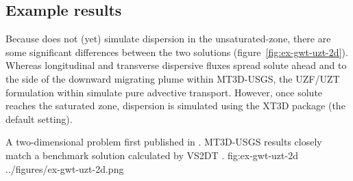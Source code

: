 \subsection{Example results}

Because \mf does not (yet) simulate dispersion in the unsaturated-zone, there are some significant differences between the two solutions (figure~\ref{fig:ex-gwt-uzt-2d}).  Whereas longitudinal and transverse dispersive fluxes spread solute ahead and to the side of the downward migrating plume within MT3D-USGS, the UZF/UZT formulation within \mf simulate pure advective transport.  However, once solute reaches the saturated zone, dispersion is simulated using the XT3D package (the default setting).  

\begin{StandardFigure}
	{A two-dimensional problem first published in \cite{morway2013}.  MT3D-USGS results closely match a benchmark solution calculated by VS2DT \citep{lappalaetal1987VS2D}.}
	{fig:ex-gwt-uzt-2d}
	{../figures/ex-gwt-uzt-2d.png}
\end{StandardFigure}
